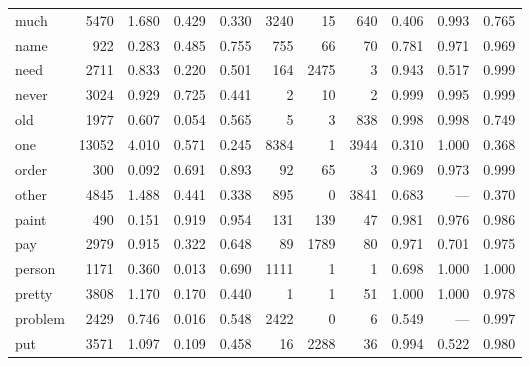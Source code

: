\begin{landscape}
\begin{longtable}[c]{ l | r r c c | r r r | r r r }
  much       & 5470  & 1.680                   & 0.429           & 0.330      & 3240      & 15          & 640          & 0.406     & 0.993       & 0.765\\
  name       & 922   & 0.283                   & 0.485           & 0.755      & 755       & 66          & 70           & 0.781     & 0.971       & 0.969\\
  need       & 2711  & 0.833                   & 0.220           & 0.501      & 164       & 2475        & 3            & 0.943     & 0.517       & 0.999\\
  never      & 3024  & 0.929                   & 0.725           & 0.441      & 2         & 10          & 2            & 0.999     & 0.995       & 0.999\\
  old        & 1977  & 0.607                   & 0.054           & 0.565      & 5         & 3           & 838          & 0.998     & 0.998       & 0.749\\
  one        & 13052 & 4.010                   & 0.571           & 0.245      & 8384      & 1           & 3944         & 0.310     & 1.000       & 0.368\\
  order      & 300   & 0.092                   & 0.691           & 0.893      & 92        & 65          & 3            & 0.969     & 0.973       & 0.999\\
  other      & 4845  & 1.488                   & 0.441           & 0.338      & 895       & 0           & 3841         & 0.683     & —           & 0.370\\
  paint      & 490   & 0.151                   & 0.919           & 0.954      & 131       & 139         & 47           & 0.981     & 0.976       & 0.986\\
  pay        & 2979  & 0.915                   & 0.322           & 0.648      & 89        & 1789        & 80           & 0.971     & 0.701       & 0.975\\
  person     & 1171  & 0.360                   & 0.013           & 0.690      & 1111      & 1           & 1            & 0.698     & 1.000       & 1.000\\
  pretty     & 3808  & 1.170                   & 0.170           & 0.440      & 1         & 1           & 51           & 1.000     & 1.000       & 0.978\\
  problem    & 2429  & 0.746                   & 0.016           & 0.548      & 2422      & 0           & 6            & 0.549     & —           & 0.997\\
  put        & 3571  & 1.097                   & 0.109           & 0.458      & 16        & 2288        & 36           & 0.994     & 0.522       & 0.980\\

\end{longtable}
\end{landscape}
